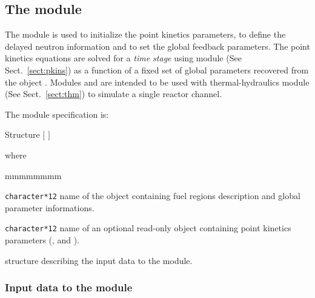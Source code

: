 \subsection{The  module}\label{sect:pkini}

\vskip 0.2cm
The  module is used to initialize the point kinetics parameters, to define the delayed neutron information
and to set the global feedback parameters. The point kinetics equations are solved for a {\sl time stage} using module
 (See Sect.~\ref{sect:pkins}) as a function of a fixed set of global parameters recovered from the  object .
Modules  and  are intended to be used with thermal-hydraulics module  (See Sect.~\ref{sect:thm})
to simulate a single reactor channel.

\vskip 0.08cm

\noindent
The  module specification is:

\begin{DataStructure}{Structure }
 \moc{:=}   $[$  $]$ \moc{::} 
\end{DataStructure}

\noindent where

\begin{ListeDeDescription}{mmmmmmmm}

\item[\dusa{MAPFL}] \texttt{character*12} name of the  
object containing fuel regions description and global parameter informations.

\item[\dusa{MACRO}] \texttt{character*12} name of an optional read-only  
object containing point kinetics parameters (,  and ).

\item[\dstr{descpkini}] structure describing the input data to the  module. 

\end{ListeDeDescription}

\vskip 0.2cm

\subsubsection{Input data to the  module}\label{sect:pkinistr}

